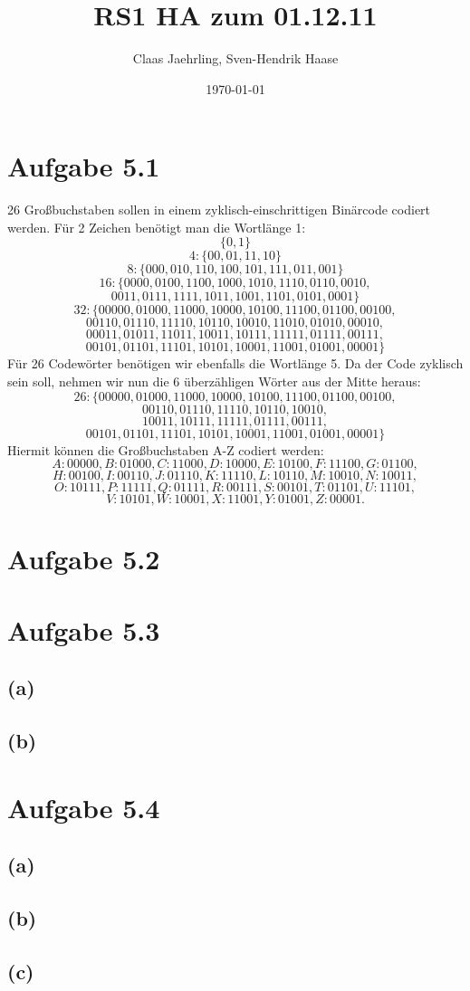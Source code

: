 \documentclass[12pt]{article}
\author{Claas Jaehrling, Sven-Hendrik Haase}
\title{RS1 HA zum 01.12.11}
\date{\today}
\begin{document}
\setcounter{secnumdepth}{0}
\maketitle

\section{Aufgabe 5.1}
26 Großbuchstaben sollen in einem zyklisch-einschrittigen Binärcode codiert werden.
Für 2 Zeichen benötigt man die Wortlänge 1:
\[\{0,1\}\]
\[4: \{00,01,11,10\}\]
\[8: \{000,010,110,100,101,111,011,001\}\]
\[16: \{0000,0100,1100,1000,1010,1110,0110,0010,\]
\[0011,0111,1111,1011,1001,1101,0101,0001\}\]
\[32: \{00000,01000,11000,10000,10100,11100,01100,00100,\]
\[00110,01110,11110,10110,10010,11010,01010,00010,\]
\[00011,01011,11011,10011,10111,11111,01111,00111,\]
\[00101,01101,11101,10101,10001,11001,01001,00001\}\]
Für 26 Codewörter benötigen wir ebenfalls die Wortlänge 5. Da der Code zyklisch
sein soll, nehmen wir nun die 6 überzähligen Wörter aus der Mitte heraus:
\[26: \{00000,01000,11000,10000,10100,11100,01100,00100,\]
\[00110,01110,11110,10110,10010,\]
\[10011,10111,11111,01111,00111,\]
\[00101,01101,11101,10101,10001,11001,01001,00001\}\]
Hiermit können die Großbuchstaben A-Z codiert werden:
\[A:00000, B:01000, C:11000, D:10000, E:10100, F:11100, G:01100,\]
\[H:00100, I:00110, J:01110, K:11110, L:10110, M:10010, N:10011,\]
\[O:10111, P:11111, Q:01111, R:00111, S:00101, T:01101, U:11101,\]
\[V:10101, W:10001, X:11001, Y:01001, Z:00001.\]

\section{Aufgabe 5.2}

\section{Aufgabe 5.3}
\subsection{(a)}
\subsection{(b)}

\section{Aufgabe 5.4}
\subsection{(a)}
\subsection{(b)}
\subsection{(c)}

\begin{align}
\end{align}
\end{document}
